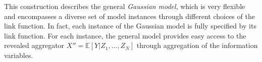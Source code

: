 \documentclass[11pt]{article}
\newcommand{\R}{\mathbb{R}}
\newcommand{\E}{\mathbb{E}}
\theoremstyle{definition}
\theoremstyle{definition}
\def\bSigma{{\bf \Sigma}}
\def\E{{\mathbb E}}
\def\Var{{\rm Var}\,}
\def\Cov{{\rm Cov}\,}
\def\Corr{{\rm Corr}\,}
\begin{document}
 This construction describes the general \textit{Gaussian model}, which is very flexible and encompasses a diverse set of model instances through different choices of the link function. In fact, each instance of the Gaussian model is fully specified by its link function. For each instance, the general model provides easy access to the revealed aggregator $X'' = \E[Y | Z_1, \dots, Z_N]$ through aggregation of the information variables. 
%
\end{document}
